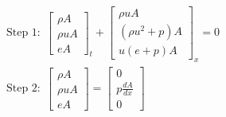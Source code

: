 \documentclass{article}%
\numberwithin{equation}{section}
\begin{document}
\begin{equation}
\begin{split}
\text{Step 1:} \ \ \left[ \begin{array}{c} \rho A \\ \rho u A \\ e A \end{array} \right]_t +  \left[ \begin{array}{c} \rho u A \\ (\rho u^2 + p) A \\ u(e + p)A \end{array} \right]_x =  0 \\
\text{Step 2:} \ \ \left[ \begin{array}{c} \rho A \\ \rho u A \\ e A \end{array} \right] = \left[ \begin{array}{c} 0 \\ p \frac{dA}{dx} \\ 0 \end{array} \right]    \end{split}
\end{equation}
\end{document}
